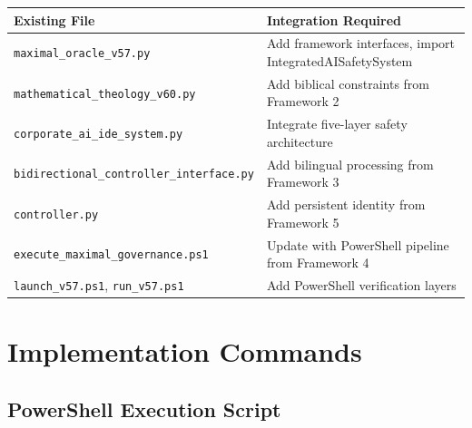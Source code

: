 \documentclass[12pt]{article}
\begin{document}
\begin{longtable}{|p{}|p{}|}
\hline
\textbf{Existing File} & \textbf{Integration Required} \\
\hline
\texttt{maximal\_oracle\_v57.py} & Add framework interfaces, import IntegratedAISafetySystem \\
\hline
\texttt{mathematical\_theology\_v60.py} & Add biblical constraints from Framework 2 \\
\hline
\texttt{corporate\_ai\_ide\_system.py} & Integrate five-layer safety architecture \\
\hline
\texttt{bidirectional\_controller\_interface.py} & Add bilingual processing from Framework 3 \\
\hline
\texttt{controller.py} & Add persistent identity from Framework 5 \\
\hline
\texttt{execute\_maximal\_governance.ps1} & Update with PowerShell pipeline from Framework 4 \\
\hline
\texttt{launch\_v57.ps1}, \texttt{run\_v57.ps1} & Add PowerShell verification layers \\
\hline
\end{longtable}

\section{Implementation Commands}

\subsection{PowerShell Execution Script}
\end{document}
